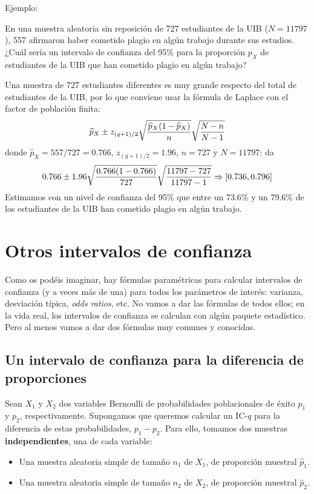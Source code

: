 \documentclass[
  spanish,
  letterpaper,
  DIV=11,
  numbers=noendperiod]{scrreprt}
\providecommand{\tightlist}{%
  \setlength{\itemsep}{0pt}\setlength{\parskip}{0pt}}
\begin{document}
Ejemplo:

En una muestra aleatoria sin reposición de 727 estudiantes de la UIB
(\(N=11797\)), 557 afirmaron haber cometido plagio en algún trabajo
durante sus estudios. ¿Cuál sería un intervalo de confianza del 95\%
para la proporción \(p_X\) de estudiantes de la UIB que han cometido
plagio en algún trabajo?

Una muestra de 727 estudiantes diferentes es muy grande respecto del
total de estudiantes de la UIB, por lo que conviene usar la fórmula de
Laplace con el factor de población finita: \[
\widehat{p}_{X}\pm z_{(q+1)/2}\sqrt{\frac{\widehat{p}_{X}
(1-\widehat{p}_{X})}{n}}\sqrt{\frac{\vphantom{(}N-n}{N-1}}
\] donde \(\widehat{p}_{X}=557/727=0.766\), \(z_{(q+1)/2}=1.96\),
\(n=727\) y \(N=11797\): da \[
0.766\pm 1.96\sqrt{\frac{0.766(1-0.766)}{727}}\sqrt{\frac{\vphantom{(}11797-727}{11797-1}}\Rightarrow [0.736, 0.796]
\] Estimamos con un nivel de confianza del 95\% que entre un 73.6\% y un
79.6\% de los estudiantes de la UIB han cometido plagio en algún
trabajo.

\section{Otros intervalos de
confianza}\label{otros-intervalos-de-confianza}

Como os podéis imaginar, hay fórmulas paramétricas para calcular
intervalos de confianza (y a veces más de una) para todos los parámetros
de interés: varianza, desviación típica, \emph{odds ratios}, etc. No
vamos a dar las fórmulas de todos ellos; en la vida real, los intervalos
de confianza se calculan con algún paquete estadístico. Pero al menos
vamos a dar dos fórmulas muy comunes y conocidas.

\subsection{Un intervalo de confianza para la diferencia de
proporciones}\label{un-intervalo-de-confianza-para-la-diferencia-de-proporciones}

Sean \(X_1\) y \(X_2\) dos variables Bernoulli de probabilidades
poblacionales de éxito \(p_1\) y \(p_2\), respectivamente. Supongamos
que queremos calcular un IC-\(q\) para la diferencia de estas
probabilidades, \(p_1-p_2\). Para ello, tomamos dos muestras
\textbf{independientes}, una de cada variable:

\begin{itemize}
\tightlist
\item
  Una muestra aleatoria simple de tamaño \(n_1\) de \(X_1\), de
  proporción muestral \(\widehat{p}_1\).
\item
  Una muestra aleatoria simple de tamaño \(n_2\) de \(X_2\), de
  proporción muestral \(\widehat{p}_2\).
\end{itemize}
\end{document}
